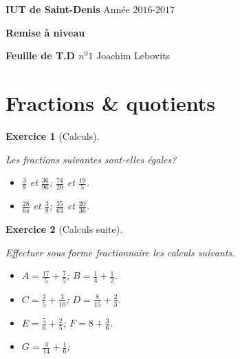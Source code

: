 \documentclass [10pt,a4paper] {article}
\newcommand{\bit} {\begin{itemize} }
\newcommand{\eit} {\end{itemize} }
\newtheorem{exo}{Exercice}
\renewcommand\theequation{\thesection.\arabic{equation}}
\begin{document}
\setlength{\parindent}{0em}
\makeatletter
\renewcommand\theequation{\thesection.\arabic{equation}}
\makeatother


\begin{flushleft}
{ \bfseries IUT de Saint-Denis}			\hspace{9.25cm}				Année $2016$-$2017$

{ \bfseries Remise à niveau	}					

{ \bfseries Feuille de T.D $n^{0}1$}		 \hspace{9.5cm} Joachim Lebovits
\end{flushleft}



%
\date\today



\vspace{1cm}



\section{Fractions \& quotients}

\begin{exo}[Calculs]

\textcolor{white}{s}


Les fractions suivantes sont-elles égales?
\bit
\item $\frac{3}{8}$ et $\frac{36}{96}$; $\frac{74}{20}$ et $\frac{19}{5}$.
\item $\frac{28}{64}$ et $\frac{3}{8}$; $\frac{35}{63}$ et $\frac{20}{36}$.
\eit
\end{exo}
\vspace{0.25cm}

\begin{exo}[Calculs suite]

\textcolor{white}{s}

Effectuer sous forme fractionnaire les calculs suivants.
\bit
\item $A = \frac{17}{5}+\frac{7}{5}$; $B= \frac{1}{4}+\frac{1}{2}$.
\item $C = \frac{3}{5}+\frac{3}{10}$; $D= \frac{8}{15}+\frac{2}{3}$.
\item $E = \frac{5}{6}+\frac{2}{5}$; $F= 8+\frac{3}{6}$.
\item $G = \frac{3}{14}+\frac{1}{6}$;
\eit
\end{exo}
\vspace{0.25cm}
\end{document}
